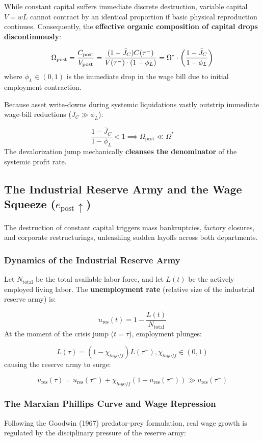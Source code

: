 \documentclass[11pt,letterpaper]{report}
\newcommand{\fitmath}[1]{\begingroup\setbox0=\hbox{$\displaystyle #1$}\ifdim\wd0>\linewidth\resizebox{\linewidth}{!}{$\displaystyle #1$}\else\displaystyle #1\fi\endgroup}
\begin{document}
While constant capital suffers immediate discrete destruction, variable capital $V=wL$ cannot contract by an identical proportion if basic physical reproduction continues. Consequently, the \textbf{effective organic composition of capital drops discontinuously}:

\[\fitmath{{\Omega }_{\mathrm{post}}=\frac{{C}_{\mathrm{post}}}{{V}_{\mathrm{post}}}=\frac{(1-{\bar{J}}_{C})C({\tau }^{-})}{V({\tau }^{-})\cdot (1-{\phi }_{L})}={\Omega }^{*}\cdot \left({\frac{1-{\bar{J}}_{C}}{1-{\phi }_{L}}}\right)}\]
where ${\phi }_{L}\in (0,1)$ is the immediate drop in the wage bill due to initial employment contraction.

Because asset write-downs during systemic liquidations vastly outstrip immediate wage-bill reductions (${\bar{J}}_{C}\gg {\phi }_{L}$):

\[
\frac{1 - \bar{J}_C}{1 - \phi_L} < 1 \implies \Omega_{\text{post}} \ll \Omega^*
\]
The devalorization jump mechanically \textbf{cleanses the denominator} of the systemic profit rate.

\subsection{The Industrial Reserve Army and the Wage Squeeze (${e}_{\mathrm{post}}\uparrow$)}
The destruction of constant capital triggers mass bankruptcies, factory closures, and corporate restructurings, unleashing sudden layoffs across both departments.

\subsubsection{Dynamics of the Industrial Reserve Army}
Let ${N}_{\mathrm{total}}$ be the total available labor force, and let $L(t)$ be the actively employed living labor. The \textbf{unemployment rate} (relative size of the industrial reserve army) is:

\[
{u}_{\mathrm{res}}(t)=1-\frac{L(t)}{{N}_{\mathrm{total}}}
\]
At the moment of the crisis jump ($t=\tau$), employment plunges:

\[
L(\tau )=(1-{\chi }_{layoff})L({\tau }^{-}),{\chi }_{layoff}\in (0,1)
\]
causing the reserve army to surge:

\[
{u}_{\mathrm{res}}(\tau )={u}_{\mathrm{res}}({\tau }^{-})+{\chi }_{layoff}(1-{u}_{\mathrm{res}}({\tau }^{-}))\gg {u}_{\mathrm{res}}({\tau }^{-})
\]
\subsubsection{The Marxian Phillips Curve and Wage Repression}
Following the Goodwin (1967) predator-prey formulation, real wage growth is regulated by the disciplinary pressure of the reserve army:
\end{document}
